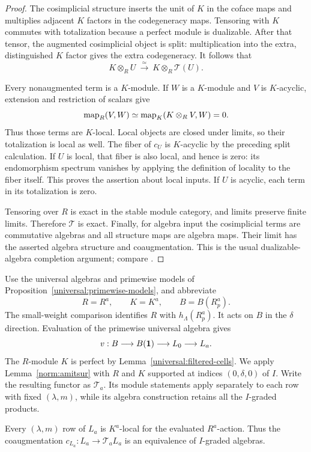 \begin{proof}
The cosimplicial structure inserts the unit of $K$ in the coface maps
and multiplies adjacent $K$ factors in the codegeneracy maps.
Tensoring with $K$ commutes with totalization because a perfect module
is dualizable.  After that tensor, the augmented cosimplicial object
is split: multiplication into the extra, distinguished $K$ factor
gives the extra codegeneracy.  It follows that
\[
 K\otimes_R U\ \xrightarrow{\simeq}\
 K\otimes_R\mathcal T(U).
\]

Every nonaugmented term is a $K$-module.  If $W$ is a $K$-module and
$V$ is $K$-acyclic, extension and restriction of scalars give
\[
 \operatorname{map}_R(V,W)\simeq\operatorname{map}_K(K\otimes_R V,W)=0.
\]
Thus those terms are $K$-local.  Local objects are closed under
limits, so their totalization is local as well.  The fiber of $c_U$
is $K$-acyclic by the preceding split calculation.  If $U$ is local,
that fiber is also local, and hence is zero: its endomorphism spectrum
vanishes by applying the definition of locality to the fiber itself.
This proves the assertion about local inputs.  If $U$ is acyclic,
each term in its totalization is zero.

Tensoring over $R$ is exact in the stable module category, and limits
preserve finite limits.  Therefore $\mathcal T$ is exact.  Finally,
for algebra input the cosimplicial terms are commutative algebras and
all structure maps are algebra maps.  Their limit has the asserted
algebra structure and coaugmentation.  This is the usual
dualizable-algebra completion argument; compare
\cite[Example~2.18 and Proposition~2.21]{MNN2017}.
\end{proof}

Use the universal algebras and primewise models of
Proposition~\ref{universal:primewise-models}, and abbreviate
\[
 R=R^a,\qquad K=K^a,\qquad B=B(R_p^a).
\]
The small-weight comparison identifies $R$ with $h_\Lambda(R_p^a)$.
It acts on $B$ in the $\delta$ direction.  Evaluation of the
primewise universal algebra gives
\[
 v:B\longrightarrow B(\mathbf 1)\longrightarrow L_0
       \longrightarrow L_a.
\]
The $R$-module $K$ is perfect by Lemma~\ref{universal:filtered-cells}.
We apply Lemma~\ref{norm:amitsur} with $R$ and $K$ supported at
indices $(0,\delta,0)$ of $I$.  Write the resulting functor as
$\mathcal T_a$.  Its module statements apply separately to each
row with fixed $(\lambda,m)$, while its algebra construction retains
all the $I$-graded products.

\begin{lemma}
\label{norm:target-locality}
Every $(\lambda,m)$ row of $L_a$ is $K^a$-local for the evaluated
$R^a$-action.  Thus the coaugmentation
$c_{L_a}:L_a\to\mathcal T_a L_a$ is an equivalence of
$I$-graded algebras.
\end{lemma}

